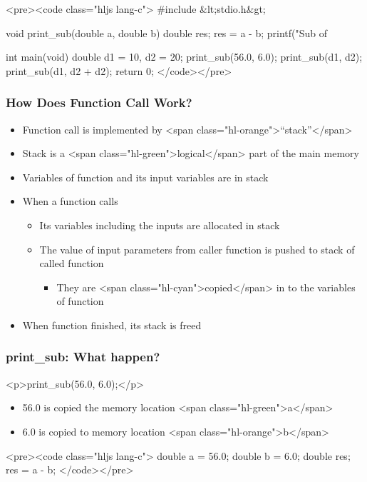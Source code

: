 \documentclass{../c-lecture}
\begin{document}
\begin{frame}
  <pre><code class="hljs lang-c">
#include &lt;stdio.h&gt;

void print_sub(double a, double b) {
  double res;
  res = a - b;
  printf("Sub of %
}

int main(void) {
  double d1 = 10, d2 = 20;
  print_sub(56.0, 6.0);
  print_sub(d1, d2);
  print_sub(d1, d2 + d2);
  return 0;
}
  </code></pre>
\end{frame}
\begin{frame}
  \frametitle{How Does Function Call Work?}
  \begin{itemize}
    \item
      Function call is implemented by <span class="hl-orange">“stack”</span>

    \item
      Stack is a <span class="hl-green">logical</span> part of the main memory

    \item Variables of function and its input variables are in stack
    \item When a function calls
    \begin{itemize}
      \item Its variables including the inputs are allocated in stack
      \item
        The value of input parameters from caller function is pushed to stack of
        called function

      \begin{itemize}
        \item
          They are <span class="hl-cyan">copied</span> in to the variables of
          function

      \end{itemize}
    \end{itemize}
    \item When function finished, its stack is freed
  \end{itemize}
\end{frame}
\begin{frame}
  \frametitle{print_sub: What happen?}
  <p>print_sub(56.0, 6.0);</p>
  \begin{itemize}
    \item 56.0 is copied the memory location <span class="hl-green">a</span>
    \item 6.0 is copied to memory location <span class="hl-orange">b</span>
  \end{itemize}
  <pre><code class="hljs lang-c">
double a = 56.0;
double b = 6.0;
double res;
res = a - b;
  </code></pre>
\end{frame}
\end{document}
